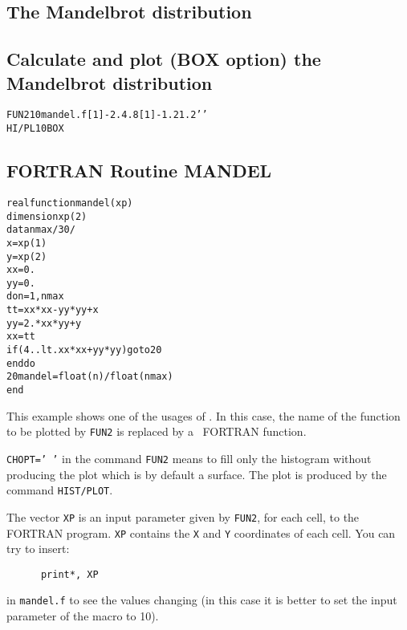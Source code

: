\clearpage

\subsection{The Mandelbrot distribution}
\subsection*{Calculate and plot (BOX option) the Mandelbrot
  distribution}
\begin{alltt}
     FUN2 10 mandel.f [1] -2.4 .8 [1] -1.2 1.2 ' '
     HI/PL 10 BOX
\end{alltt}
\subsection*{FORTRAN Routine MANDEL}
\begin{alltt}
      real function mandel(xp)
      dimension xp(2)
      data nmax/30/
      x=xp(1)
      y=xp(2)
      xx=0.
      yy=0.
      do n=1,nmax
         tt=xx*xx-yy*yy+x
         yy=2.*xx*yy+y
         xx=tt
         if (4..lt.xx*xx+yy*yy) go to 20
      enddo
   20 mandel=float(n)/float(nmax)
      end
\end{alltt} 
\begin{DinglistE}
\item This example shows one of the usages of \COMIS. In this case,
      the name of the function to be plotted by {\tt FUN2} is replaced by a
      \COMIS\ FORTRAN function.
\item {\tt CHOPT=' '} in the command {\tt FUN2} means to fill only the
      histogram without producing the plot which is by default a surface.
      The plot is produced by the command {\tt HIST/PLOT}.
\item The vector {\tt XP} is an input parameter given by {\tt FUN2}, for
      each cell, to the FORTRAN program. {\tt XP} contains the {\tt X}
      and {\tt Y} coordinates of each cell. You can try to insert:
\begin{verbatim}
      print*, XP
\end{verbatim}
  in {\tt mandel.f} to see the values changing (in this case it is better to
  set the input parameter of the macro to 10).
\end{DinglistE}

\clearpage

